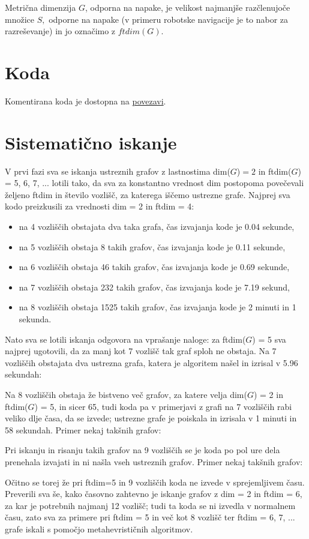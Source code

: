 \documentclass[12pt]{article}
\begin{document}
Metrična dimenzija $G$, odporna na napake, je velikost najmanjše razčlenujoče 
množice $S,$ odporne na napake (v primeru robotske navigacije je to nabor za 
razreševanje) in jo označimo z $ftdim(G).$

\section{Koda}
Komentirana koda je dostopna na \href{https://github.com/HanaSamsa/Problem-metricnih-dimenzij-odpornih-na-napake.git}{povezavi}.

\section{Sistematično iskanje}

V prvi fazi sva se iskanja ustreznih grafov z lastnostima dim($G$)$ =2$ in ftdim($G$) = 5, 6, 7, ... lotili tako, da sva za konstantno vrednost dim postopoma povečevali željeno ftdim in število vozlišč, za katerega iščemo ustrezne grafe. Najprej sva kodo preizkusili za vrednosti dim = 2 in ftdim = 4:
\begin{itemize}
    \item na 4 vozliščih obstajata dva taka grafa, čas izvajanja kode je 0.04 sekunde,
    \item na 5 vozliščih obstaja 8 takih grafov, čas izvajanja kode je 0.11 sekunde,
    \item na 6 vozliščih obstaja 46 takih grafov, čas izvajanja kode je 0.69 sekunde,
    \item na 7 vozliščih obstaja 232 takih grafov, čas izvajanja kode je 7.19 sekund,
    \item na 8 vozliščih obstaja 1525 takih grafov, čas izvajanja kode je 2 minuti in 1 sekunda.
\end{itemize}
Nato sva se lotili iskanja odgovora na vprašanje naloge: za ftdim($G$) = 5 sva najprej ugotovili, da za manj kot 7 vozlišč tak graf sploh ne obstaja. Na 7 vozliščih obstajata dva ustrezna grafa, katera je algoritem našel in izrisal v 5.96 sekundah:


Na 8 vozliščih obstaja že bistveno več grafov, za katere velja dim($G$) = 2 in ftdim($G$) = 5, in sicer 65, tudi koda pa v primerjavi z grafi na 7 vozliščih rabi veliko dlje časa, da se izvede; ustrezne grafe je poiskala in izrisala v 1 minuti in 58 sekundah. Primer nekaj takšnih grafov: 


Pri iskanju in risanju takih grafov na 9 vozliščih se je koda po pol ure dela prenehala izvajati in ni našla vseh ustreznih grafov. Primer nekaj takšnih grafov:


Očitno se torej že pri ftdim=5 in 9 vozliščih koda ne izvede v sprejemljivem času. Preverili sva še, kako časovno zahtevno je iskanje grafov z dim = 2 in ftdim = 6, za kar je potrebnih najmanj 12 vozlišč; tudi ta koda se ni izvedla v normalnem času, zato sva za primere pri ftdim = 5 in več kot 8 vozlišč ter ftdim = 6, 7, ... grafe iskali s pomočjo metahevrističnih algoritmov. 
\end{document}
